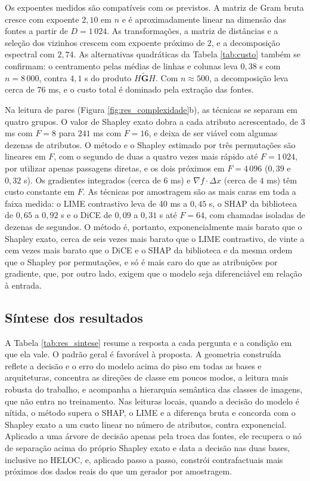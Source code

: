 Os expoentes medidos são compatíveis com os previstos. A matriz de Gram bruta cresce com expoente $2{,}10$ em $n$ e é aproximadamente linear na dimensão das fontes a partir de $D = 1\,024$. As transformações, a matriz de distâncias e a seleção dos vizinhos crescem com expoente próximo de 2, e a decomposição espectral com $2{,}74$. As alternativas quadráticas da Tabela \ref{tab:custo} também se confirmam: o centramento pelas médias de linhas e colunas leva $0{,}38$ s com $n = 8\,000$, contra $4{,}1$ s do produto $H\widetilde{\mathbf{G}}H$. Com $n \approx 500$, a decomposição leva cerca de $76$ ms, e o custo total é dominado pela extração das fontes.

Na leitura de pares (Figura \ref{fig:res_complexidade}b), as técnicas se separam em quatro grupos. O valor de Shapley exato dobra a cada atributo acrescentado, de $3$ ms com $F = 8$ para $241$ ms com $F = 16$, e deixa de ser viável com algumas dezenas de atributos. O método e o Shapley estimado por três permutações são lineares em $F$, com o segundo de duas a quatro vezes mais rápido até $F = 1\,024$, por utilizar apenas passagens diretas, e os dois próximos em $F = 4\,096$ ($0{,}39$ e $0{,}32$ s). Os gradientes integrados (cerca de $6$ ms) e $\nabla f\cdot\Delta x$ (cerca de $4$ ms) têm custo constante em $F$. As técnicas por amostragem são as mais caras em toda a faixa medida: o LIME contrastivo leva de $40$ ms a $0{,}45$ s, o SHAP da biblioteca de $0{,}65$ a $0{,}92$ s e o DiCE de $0{,}09$ a $0{,}31$ s até $F = 64$, com chamadas isoladas de dezenas de segundos. O método é, portanto, exponencialmente mais barato que o Shapley exato, cerca de seis vezes mais barato que o LIME contrastivo, de vinte a cem vezes mais barato que o DiCE e o SHAP da biblioteca e da mesma ordem que o Shapley por permutações, e só é mais caro do que as atribuições por gradiente, que, por outro lado, exigem que o modelo seja diferenciável em relação à entrada.

\subsection{Síntese dos resultados}\label{subsec:res_sintese}

A Tabela \ref{tab:res_sintese} resume a resposta a cada pergunta e a condição em que ela vale. O padrão geral é favorável à proposta. A geometria construída reflete a decisão e o erro do modelo acima do piso em todas as bases e arquiteturas, concentra as direções de classe em poucos modos, a leitura mais robusta do trabalho, e acompanha a hierarquia semântica das classes de imagens, que não entra no treinamento. Nas leituras locais, quando a decisão do modelo é nítida, o método supera o SHAP, o LIME e a diferença bruta e concorda com o Shapley exato a um custo linear no número de atributos, contra exponencial. Aplicado a uma árvore de decisão apenas pela troca das fontes, ele recupera o nó de separação acima do próprio Shapley exato e data a decisão nas duas bases, inclusive no HELOC, e, aplicado passo a passo, constrói contrafactuais mais próximos dos dados reais do que um gerador por amostragem.

